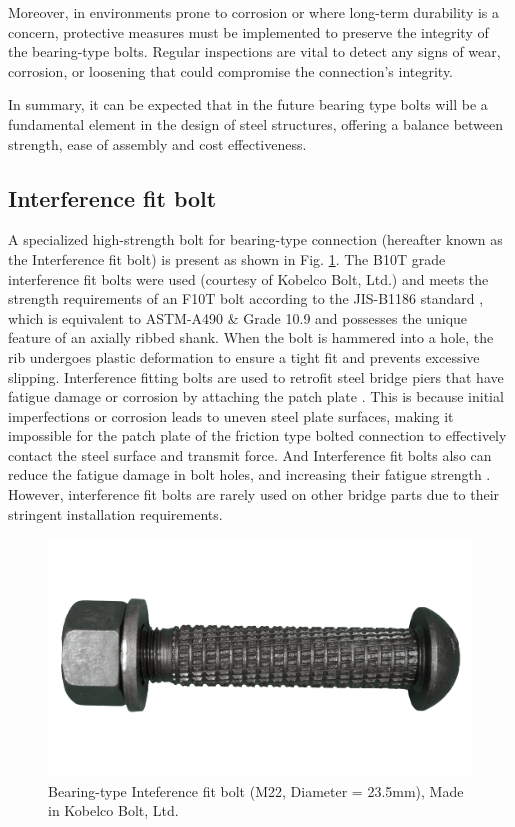 Moreover, in environments prone to corrosion or where long-term durability is a concern, protective measures must be implemented to preserve the integrity of the bearing-type bolts. Regular inspections are vital to detect any signs of wear, corrosion, or loosening that could compromise the connection's integrity.

In summary, it can be expected that in the future bearing type bolts will be a fundamental element in the design of steel structures, offering a balance between strength, ease of assembly and cost effectiveness.

\subsection{Interference fit bolt}

A specialized high-strength bolt for bearing-type connection (hereafter known as the Interference fit bolt) is present \cite{Kulak1988guide,bolt-bearing,Chen2023MechanicalConnections} as shown in Fig. \ref{fig-onebbolt}. The B10T grade interference fit bolts were used (courtesy of Kobelco Bolt, Ltd.) and meets the strength requirements of an F10T bolt according to the JIS-B1186 standard \cite{jis2018JIS}, which is equivalent to ASTM-A490 \cite{ASTM-bolt} \& Grade 10.9 \cite{ISO-bolt} and possesses the unique feature of an axially ribbed shank. When the bolt is hammered into a hole, the rib undergoes plastic deformation to ensure a tight fit and prevents excessive slipping. Interference fitting bolts are used to retrofit steel bridge piers that have fatigue damage or corrosion by attaching the patch plate \cite{Anami-bbolt-ate}. This is because initial imperfections or corrosion leads to uneven steel plate surfaces, making it impossible for the patch plate of the friction type bolted connection to effectively contact the steel surface and transmit force. And Interference fit bolts also can reduce the fatigue damage in bolt holes, and increasing their fatigue strength \cite{Guo20205}. However, interference fit bolts are rarely used on other bridge parts due to their stringent installation requirements. 

\begin{figure}
    \centering
    \includegraphics[width=0.8\linewidth]{imgs/ch2/oneBbolt.png}
    \caption{Bearing-type Inteference fit bolt (M22, Diameter = 23.5mm), Made in Kobelco Bolt, Ltd.}
    \label{fig-onebbolt}
\end{figure}

